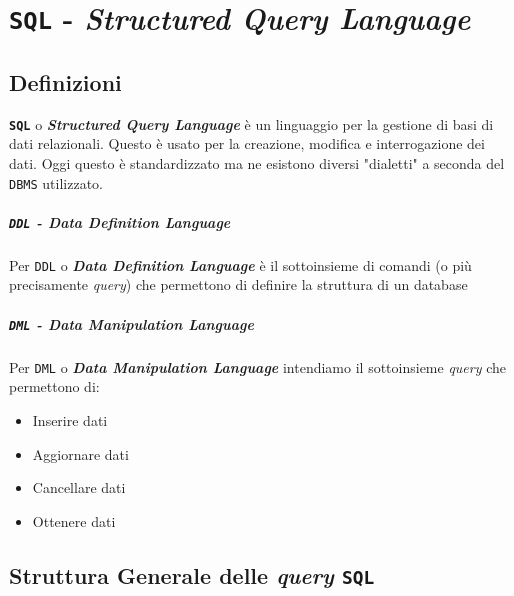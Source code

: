 \chapter[\texttt{SQL}]{\texttt{SQL} - \textit{Structured Query Language}}
\thispagestyle{chapterInit}
\section{Definizioni}
    \texttt{\textbf{SQL}} o \textbf{\textit{Structured Query Language}} è un linguaggio per la gestione di basi di dati relazionali. Questo è usato per la creazione, modifica e interrogazione dei dati. Oggi questo è standardizzato ma ne esistono diversi "dialetti" a seconda del \texttt{DBMS} utilizzato.
    \paragraph{\texttt{DDL} - \textit{Data Definition Language}} 
        Per \texttt{DDL} o \textbf{\textit{Data Definition Language}} è il sottoinsieme di comandi (o più precisamente \textit{query}) che permettono di definire la struttura di un database
    \paragraph{\texttt{DML} - \textit{Data Manipulation Language}}
        Per \texttt{DML} o \textbf{\textit{Data Manipulation Language}} intendiamo il sottoinsieme \textit{query} che permettono di:\begin{itemize}
            \item Inserire dati
            \item Aggiornare dati
            \item Cancellare dati
            \item Ottenere dati
        \end{itemize}
\section{Struttura Generale delle \textit{query} \texttt{SQL}}
